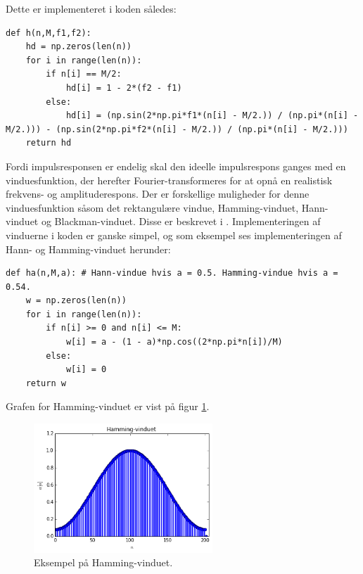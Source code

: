 Dette er implementeret i koden således:
\begin{lstlisting}
def h(n,M,f1,f2):
    hd = np.zeros(len(n))
    for i in range(len(n)):
        if n[i] == M/2:
            hd[i] = 1 - 2*(f2 - f1)
        else:
            hd[i] = (np.sin(2*np.pi*f1*(n[i] - M/2.)) / (np.pi*(n[i] - M/2.))) - (np.sin(2*np.pi*f2*(n[i] - M/2.)) / (np.pi*(n[i] - M/2.)))
    return hd
\end{lstlisting}

Fordi impulsresponsen er endelig skal den ideelle impulsrespons ganges med en vinduesfunktion, der herefter Fourier-transformeres for at opnå en realistisk frekvens- og amplituderespons. Der er forskellige muligheder for denne vinduesfunktion såsom det rektangulære vindue, Hamming-vinduet, Hann-vinduet og Blackman-vinduet. Disse er beskrevet i \cite{side 558-559, DTSP}. Implementeringen af vinduerne i koden er ganske simpel, og som eksempel ses implementeringen af Hann- og Hamming-vinduet herunder:
\begin{lstlisting}
def ha(n,M,a): # Hann-vindue hvis a = 0.5. Hamming-vindue hvis a = 0.54.
    w = np.zeros(len(n))
    for i in range(len(n)):
        if n[i] >= 0 and n[i] <= M:
            w[i] = a - (1 - a)*np.cos((2*np.pi*n[i])/M)
        else:
            w[i] = 0
    return w
\end{lstlisting}

Grafen for Hamming-vinduet er vist på figur \ref{fig:Hamming}.
\begin{figure}[H]
    \centering
    \includegraphics[width = 0.6\textwidth]{figures/Hamming-vindue.PNG}
    \caption{Eksempel på Hamming-vinduet.}
    \label{fig:Hamming}
\end{figure}